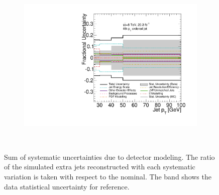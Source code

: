 \begin{figure}
\begin{subfigure}[]{0.45\textwidth}
\end{subfigure}
~
\begin{subfigure}[]{0.45\textwidth}
\includegraphics[width=\textwidth]{fig/CombSystPlots/Jet3.pdf}
\end{subfigure}
~
\caption{Sum of systematic uncertainties due to detector modeling. The ratio of the simulated extra jets reconstructed with each systematic variation is taken with respect to the nominal. The band shows the data statistical uncertainty for reference.}
\label{fig:SmoothSys}
\end{figure}

